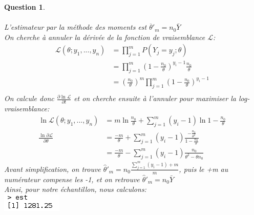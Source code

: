 \documentclass[a4paper,11pt]{article}
\newtheorem{exo2}{Question}
\begin{document}
\begin{exo2} \ \\ \\
L'estimateur par la méthode des moments est $\overline{\theta}'_m = n_0 \bar{Y}$\ \\
On cherche à annuler la dérivée de la fonction de vraisemblance $\mathcal{L}$:
\begin{equation}
\begin{aligned}
\mathcal{L}(\theta;y_1,...,y_n) & = \prod_{j=1}^{m}P(Y_j = y_j; \theta) \ \\
& = \prod_{j=1}^{m}(1-\frac{n_0}{\theta})^{y_i - 1}\frac{n_0}{\theta}\ \\
& = (\frac{n_0}{\theta})^{m} \prod_{j=1}^{m} (1-\frac{n_0}{\theta})^{y_i -1} \ \\
\end{aligned}
\end{equation}
On calcule donc $\frac{\partial{\ln{\mathcal{L}}}}{\partial{t}}$ et on cherche ensuite à l'annuler pour maximiser la log-vraisemblance:
\begin{equation}
\begin{aligned}
    \ln{\mathcal{L}}(\theta;y_1,...,y_n) & = m\ln{\frac{n_0}{\theta}} + \sum_{j=1}^{m} (y_i - 1)\ln{1 - \frac{n_0}{\theta}}\ \\
    \frac{\ln{\partial{\mathcal{L}}}}{\partial{\theta}} & = \frac{-m}{\theta} + \sum_{j=1}^{m} (y_i - 1)\frac{-\frac{n_0}{\theta^2}}{1-\frac{n_0}{\theta}} \ \\
    & = \frac{-m}{\theta} - \sum_{j=1}^{m} (y_i - 1)\frac{n_0}{\theta^2-\theta n_0}
\end{aligned}
\end{equation}
Avant simplification, on trouve $\hat{\theta}'_m = n_0 \frac{\sum_{j=1}^{m} (y_i - 1) + m}{m}$, puis le +m au numérateur compense les -1, et on retrouve $\hat{\theta}'_m = n_0 \bar{Y}$ \ \\
Ainsi, pour notre échantillon, nous calculons: \ \\
\includegraphics[scale=0.5]{images/Q2_3.png} \ \\
\end{exo2}
\end{document}
